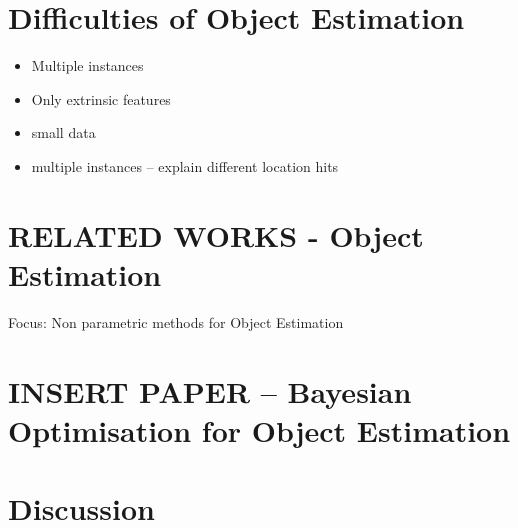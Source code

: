 \section{Difficulties of Object Estimation}
\begin{itemize}
\item Multiple instances
\item Only extrinsic features
\item small data
\item multiple instances -- explain different location hits
\end{itemize}
\section{RELATED WORKS - Object Estimation}
Focus: Non parametric methods for Object Estimation
\section{INSERT PAPER -- Bayesian Optimisation for Object Estimation}
\section{Discussion}

